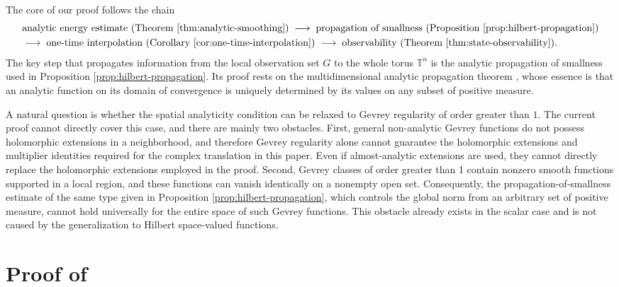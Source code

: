 \documentclass[print,wide]{draft}
\begin{document}
The core of our proof follows the chain
%
\[
\begin{aligned}
&\text{analytic energy estimate (Theorem \ref{thm:analytic-smoothing})} \;\longrightarrow\; \text{propagation of smallness (Proposition \ref{prop:hilbert-propagation})} \\
&\longrightarrow\; \text{one-time interpolation (Corollary \ref{cor:one-time-interpolation})} \;\longrightarrow\; \text{observability (Theorem \ref{thm:state-observability})}.
\end{aligned}
\]
%
The key step that propagates information from the local observation set \(G\) to the whole torus \(\mathbb{T}^n\) is the analytic propagation of smallness used in Proposition \ref{prop:hilbert-propagation}. Its proof rests on the multidimensional analytic propagation theorem  \cite[Theorem~4]{Apraiz2014}, whose essence is that an analytic function on its domain of convergence is uniquely determined by its values on any subset of positive measure.

A natural question is whether the spatial analyticity condition can be relaxed to Gevrey regularity of order greater than $1$. The current proof cannot directly cover this case, and there are mainly two obstacles. First, general non-analytic Gevrey functions do not possess holomorphic extensions in a neighborhood, and therefore Gevrey regularity alone cannot guarantee the holomorphic extensions and multiplier identities required for the complex translation in this paper. Even if almost-analytic extensions are used, they cannot directly replace the holomorphic extensions employed in the proof. Second, Gevrey classes of order greater than 1 contain nonzero smooth functions supported in a local region, and these functions can vanish identically on a nonempty open set. Consequently, the propagation-of-smallness estimate of the same type given in Proposition \ref{prop:hilbert-propagation}, which controls the global norm from an arbitrary set of positive measure, cannot hold universally for the entire space of such Gevrey functions. This obstacle already exists in the scalar case and is not caused by the generalization to Hilbert space-valued functions. 

 


\appendix

\section{Proof of }\label{app:galerkin}
\end{document}
